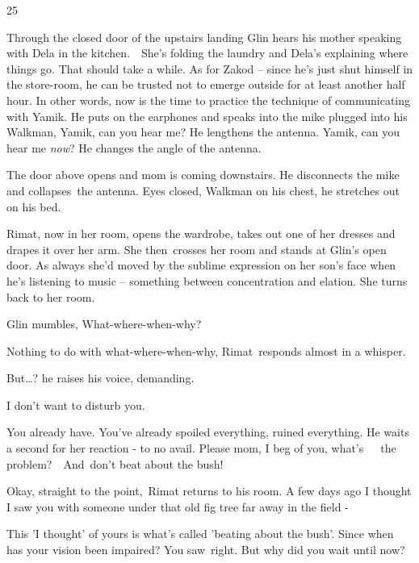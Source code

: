 \documentclass[letterpaper]{article}
\begin{document}
25~~

Through the closed door of the upstairs landing Glin hears his mother speaking with Dela in the kitchen.\ \ She's
folding the laundry and Dela's explaining where things go. That should take a while. As for Zakod -- since he's just
shut himself in the store-room, he can be trusted not to emerge outside for at least another half hour. In other words,
now is the time to practice the technique of communicating with Yamik. He puts on the earphones and speaks into the
mike plugged into his Walkman, {\textquotedbl}Yamik, can you hear me?{\textquotedbl} He lengthens the antenna.
{\textquotedbl}Yamik, can you hear me \textit{now}?{\textquotedbl} He changes the angle of the antenna.

The door above opens and mom is coming downstairs. He disconnects the mike and collapses\textcolor{red}{\ }the antenna.
Eyes closed, Walkman on his chest, he stretches out on his bed.\ 

Rimat, now in her room, opens the wardrobe, takes out one of her dresses and drapes it over her arm. She then\ crosses
her room and stands at Glin's open door. As always she'd moved by the sublime expression on her son's face when he's
listening to music -- something between concentration and elation. She turns back to her room.

Glin mumbles, {\textquotedbl}What-where-when{}-why?{\textquotedbl} 

{\textquotedbl}Nothing to do with what-where-when-why,{\textquotedbl} Rimat\ responds almost in a whisper. 

{\textquotedbl}But{\dots}?{\textquotedbl} he raises his voice, demanding. 

{\textquotedbl}I don't want to disturb you.{\textquotedbl} 

{\textquotedbl}You already have. You've already spoiled everything, ruined everything.{\textquotedbl} He waits a second
for her reaction - to no avail. {\textquotedbl}Please mom, I beg of you, what's\ \ \ the problem?\ \ And~don't beat
about the bush!{\textquotedbl}

{\textquotedbl}Okay, straight to the point,{\textquotedbl}\ Rimat returns to his room. {\textquotedbl}A few days ago I
thought I saw you with someone under that old fig tree far away in the field -{\textquotedbl} 

{\textquotedbl}This 'I thought' of yours is what's called {}'beating about the bush{}'. Since when has your vision been
impaired? You saw~right. But why did you wait until now?{\textquotedbl} 
\end{document}
